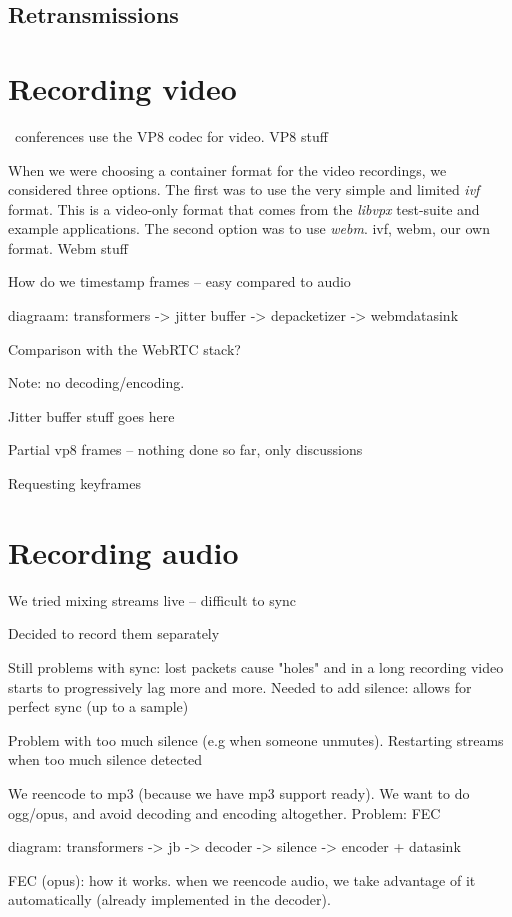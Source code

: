 \documentclass[twoside,openright,a4paper,11pt,english]{article}
\begin{document}
\subsection{Retransmissions}

\section{Recording video}
\label{recording-video}
\jm\ conferences use the VP8 codec for video.
VP8 stuff

When we were choosing a container format for the video recordings, we considered three options.
The first was to use the very simple and limited \emph{ivf} format. This is a video-only format
that comes from the \emph{libvpx} test-suite and example applications. The second option was to use \emph{webm}.
ivf, webm, our own format.
Webm stuff

How do we timestamp frames -- easy compared to audio

diagraam: transformers -> jitter buffer -> depacketizer -> webmdatasink

Comparison with the WebRTC stack?

Note: no decoding/encoding.

Jitter buffer stuff goes here

Partial vp8 frames -- nothing done so far, only discussions

Requesting keyframes

\section{Recording audio}
\label{recording-audio}
We tried mixing streams live -- difficult to sync

Decided to record them separately

Still problems with sync: lost packets cause "holes" and in a long recording video starts to progressively lag more and more.
Needed to add silence: allows for perfect sync (up to a sample)

Problem with too much silence (e.g when someone unmutes). Restarting streams when too much silence detected

We reencode to mp3 (because we have mp3 support ready). We want to do ogg/opus, and avoid decoding and encoding altogether. Problem: FEC

diagram:
transformers -> jb -> decoder -> silence -> encoder + datasink

FEC (opus): how it works. when we reencode audio, we take advantage of it automatically (already implemented in the decoder).
\end{document}
